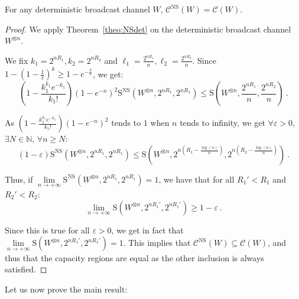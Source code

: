 \begin{corollary}
  \label{cor:NSdet}
  For any deterministic broadcast channel $W$, $\mathcal{C}^{\mathrm{NS}}(W)=\mathcal{C}(W)$.
\end{corollary}
\begin{proof}
  We apply Theorem~\ref{theo:NSdet} on the deterministic broadcast channel $W^{\otimes n}$.

  We fix $k_1=2^{nR_1},k_2=2^{nR_2}$ and $\ell_1=\frac{2^{nR_1}}{n},\ell_2=\frac{2^{nR_2}}{n}$. Since $1-\left(1-\frac{1}{\ell}\right)^{k} \geq 1-e^{-\frac{k}{\ell}}$, we get:
\[ \left(1 - \frac{k_1^{k_1}e^{-k_1}}{k_1!}\right)\left(1-e^{-n}\right)^2\mathrm{S}^{\mathrm{NS}}(W^{\otimes n},2^{nR_1},2^{nR_1}) \leq \mathrm{S}\left(W^{\otimes n},\frac{2^{nR_1}}{n},\frac{2^{nR_2}}{n}\right)\ . \]

  As $\left(1 - \frac{k_1^{k_1}e^{-k_1}}{k_1!}\right)\left(1-e^{-n}\right)^2$ tends to $1$ when $n$ tends to infinity, we get $\forall \varepsilon > 0$, $\exists N \in \mathbb{N}$, $\forall n\geq N$:
\[ (1-\varepsilon)\mathrm{S}^{\mathrm{NS}}(W^{\otimes n},2^{nR_1},2^{nR_1}) \leq \mathrm{S}(W^{\otimes n},2^{n(R_1-\frac{\log(n)}{n})},2^{n(R_2-\frac{\log(n)}{n})}) \ . \]

Thus, if $\underset{n \rightarrow +\infty}{\lim} \mathrm{S}^{\mathrm{NS}}(W^{\otimes n},2^{nR_1},2^{nR_1})  = 1$, we have that for all $R_1'<R_1$ and $R_2'<R_2$:
\[ \underset{n \rightarrow +\infty}{\lim} \mathrm{S}(W^{\otimes n},2^{nR_1'},2^{nR_1'}) \geq 1-\varepsilon \ . \]

Since this is true for all $\varepsilon > 0$, we get in fact that $\underset{n \rightarrow +\infty}{\lim} \mathrm{S}(W^{\otimes n},2^{nR_1'},2^{nR_1'}) = 1$. This implies that $\mathcal{C}^{\mathrm{NS}}(W) \subseteq \mathcal{C}(W)$, and thus that the capacity regions are equal as the other inclusion is always satisfied.

\end{proof}

Let us now prove the main result:

